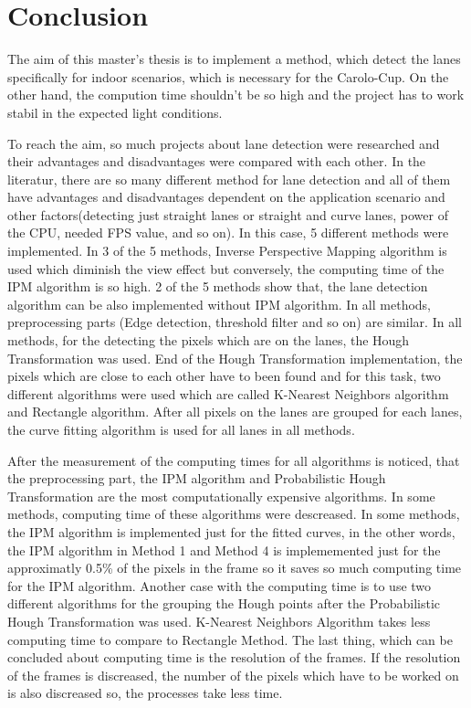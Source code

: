 %
\chapter{Conclusion}\label{cha:Conclusion}
%

The aim of this master's thesis is to implement a method, which detect the lanes specifically for indoor scenarios, which is necessary for the Carolo-Cup. On the other hand, the compution time shouldn't be so high and the project has to work stabil in the expected light conditions. 

To reach the aim, so much projects about lane detection were researched and their advantages and disadvantages were compared with each other. In the literatur, there are so many different method for lane detection and all of them have advantages and disadvantages  	dependent on the application scenario and other factors(detecting just straight lanes or straight and curve lanes, power of the CPU, needed FPS value, and so on). In this case, 5 different methods were implemented. In  3 of the 5 methods, Inverse Perspective Mapping algorithm is used which diminish the view effect but conversely, the computing time of the IPM algorithm is so high. 2 of the 5 methods show that, the lane detection algorithm can be also implemented without IPM algorithm. In all methods, preprocessing parts (Edge detection, threshold filter and so on) are similar. In all methods, for the detecting the pixels which are on the lanes, the Hough Transformation was used. End of the Hough Transformation implementation, the pixels which are close to each other have to been found and for this task, two different algorithms were used which are called K-Nearest Neighbors algorithm and Rectangle algorithm. After all pixels on the lanes are grouped for each lanes, the curve fitting algorithm is used for all lanes in all methods.

After the measurement of the computing times for all algorithms is noticed, that the preprocessing part, the IPM algorithm and Probabilistic Hough Transformation are the most computationally expensive algorithms. In some methods, computing time of these algorithms were descreased. In some methods, the IPM algorithm is implemented just for the fitted curves, in the other words, the IPM algorithm in Method 1 and Method 4 is implememented just for the approximatly 0.5\% of the pixels in the frame so it saves so much computing time for the IPM algorithm.  Another case with the computing time is to use two different algorithms for the grouping the Hough points after the Probabilistic Hough Transformation was used. K-Nearest Neighbors Algorithm takes less computing time to compare to Rectangle Method. The last thing, which can be concluded about computing time is the resolution of the frames. If the resolution of the frames is discreased, the number of the pixels which have to be worked on is also discreased so, the processes take less time.